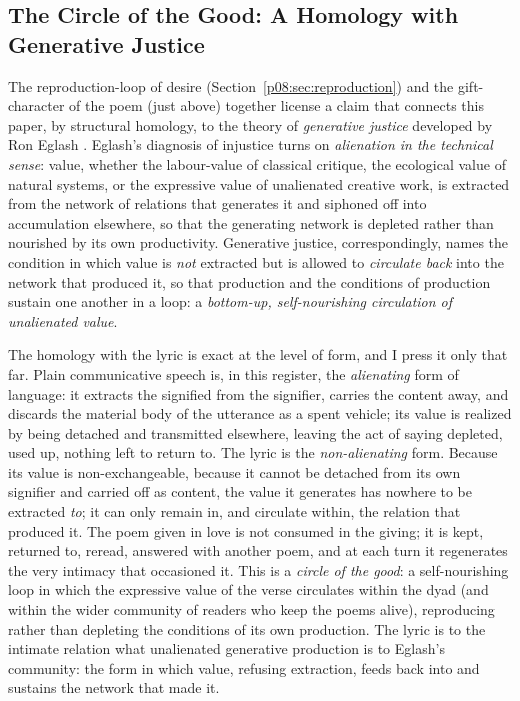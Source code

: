 \subsection{The Circle of the Good: A Homology with Generative Justice}\label{p08:sec:circle}

The reproduction-loop of desire (Section~\ref{p08:sec:reproduction}) and the gift-character of the poem (just above) together license a claim that connects this paper, by structural homology, to the theory of \emph{generative justice} developed by Ron Eglash \parencite{eglash2016generative}. Eglash's diagnosis of injustice turns on \emph{alienation in the technical sense}: value, whether the labour-value of classical critique, the ecological value of natural systems, or the expressive value of unalienated creative work, is extracted from the network of relations that generates it and siphoned off into accumulation elsewhere, so that the generating network is depleted rather than nourished by its own productivity. Generative justice, correspondingly, names the condition in which value is \emph{not} extracted but is allowed to \emph{circulate back} into the network that produced it, so that production and the conditions of production sustain one another in a loop: a \emph{bottom-up, self-nourishing circulation of unalienated value}.

The homology with the lyric is exact at the level of form, and I press it only that far. Plain communicative speech is, in this register, the \emph{alienating} form of language: it extracts the signified from the signifier, carries the content away, and discards the material body of the utterance as a spent vehicle; its value is realized by being detached and transmitted elsewhere, leaving the act of saying depleted, used up, nothing left to return to. The lyric is the \emph{non-alienating} form. Because its value is non-exchangeable, because it cannot be detached from its own signifier and carried off as content, the value it generates has nowhere to be extracted \emph{to}; it can only remain in, and circulate within, the relation that produced it. The poem given in love is not consumed in the giving; it is kept, returned to, reread, answered with another poem, and at each turn it regenerates the very intimacy that occasioned it. This is a \emph{circle of the good}: a self-nourishing loop in which the expressive value of the verse circulates within the dyad (and within the wider community of readers who keep the poems alive), reproducing rather than depleting the conditions of its own production. The lyric is to the intimate relation what unalienated generative production is to Eglash's community: the form in which value, refusing extraction, feeds back into and sustains the network that made it.

